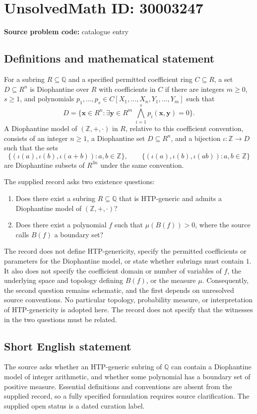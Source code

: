 \documentclass[11pt]{article}
\newcommand{\Z}{\mathbb{Z}}
\newcommand{\Q}{\mathbb{Q}}
\begin{document}
\section*{UnsolvedMath ID: 30003247}
\textbf{Source problem code:} catalogue entry
\subsection{Definitions and mathematical statement}
For a subring \(R\subseteq\Q\) and a specified permitted coefficient ring \(C\subseteq R\), a set \(D\subseteq R^n\) is Diophantine over \(R\) with coefficients in \(C\) if there are integers \(m\geq0\), \(s\geq1\), and polynomials \(p_1,\ldots,p_s\in C[X_1,\ldots,X_n,Y_1,\ldots,Y_m]\) such that
\[
D=\{\mathbf x\in R^n:\exists\mathbf y\in R^m\;\bigwedge_{i=1}^{s}p_i(\mathbf x,\mathbf y)=0\}.
\]
A Diophantine model of \((\Z,+,\cdot)\) in \(R\), relative to this coefficient convention, consists of an integer \(n\geq1\), a Diophantine set \(D\subseteq R^n\), and a bijection \(\iota:\Z\to D\) such that the sets
\[
\{(\iota(a),\iota(b),\iota(a+b)):a,b\in\Z\},\qquad
\{(\iota(a),\iota(b),\iota(ab)):a,b\in\Z\}
\]
are Diophantine subsets of \(R^{3n}\) under the same convention.

The supplied record asks two existence questions:
\begin{enumerate}
\item Does there exist a subring \(R\subseteq\Q\) that is HTP-generic and admits a Diophantine model of \((\Z,+,\cdot)\)?
\item Does there exist a polynomial \(f\) such that \(\mu(B(f))>0\), where the source calls \(B(f)\) a boundary set?
\end{enumerate}
The record does not define HTP-genericity, specify the permitted coefficients or parameters for the Diophantine model, or state whether subrings must contain \(1\). It also does not specify the coefficient domain or number of variables of \(f\), the underlying space and topology defining \(B(f)\), or the measure \(\mu\). Consequently, the second question remains schematic, and the first depends on unresolved source conventions. No particular topology, probability measure, or interpretation of HTP-genericity is adopted here. The record does not specify that the witnesses in the two questions must be related.
\subsection{Short English statement}
The source asks whether an HTP-generic subring of \(\Q\) can contain a Diophantine model of integer arithmetic, and whether some polynomial has a boundary set of positive measure. Essential definitions and conventions are absent from the supplied record, so a fully specified formulation requires source clarification. The supplied open status is a dated curation label.
\end{document}
